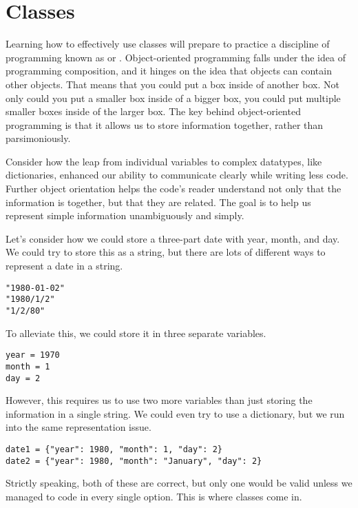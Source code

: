 \section{Classes}
Learning how to effectively use classes will prepare to practice a discipline of programming known as  or . Object-oriented programming falls under the idea of programming composition, and it hinges on the idea that objects can contain other objects. That means that you could put a box inside of another box. Not only could you put a smaller box inside of a bigger box, you could put multiple smaller boxes inside of the larger box. The key behind object-oriented programming is that it allows us to store information together, rather than parsimoniously.\par
Consider how the leap from individual variables to complex datatypes, like dictionaries, enhanced our ability to communicate clearly while writing less code. Further object orientation helps the code's reader understand not only that the information is together, but that they are related. The goal is to help us represent simple information unambiguously and simply.\par
Let's consider how we could store a three-part date with year, month, and day. We could try to store this as a string, but there are lots of different ways to represent a date in a string.
\begin{lstlisting}[style=pippython]
"1980-01-02"
"1980/1/2"
"1/2/80"
\end{lstlisting}
To alleviate this, we could store it in three separate variables.
\begin{lstlisting}[style=pippython]
year = 1970
month = 1
day = 2
\end{lstlisting}
However, this requires us to use two more variables than just storing the information in a single string. We could even try to use a dictionary, but we run into the same representation issue.
\begin{lstlisting}[style=pippython]
date1 = {"year": 1980, "month": 1, "day": 2}
date2 = {"year": 1980, "month": "January", "day": 2}
\end{lstlisting}
Strictly speaking, both of these are correct, but only one would be valid unless we managed to code in every single option. This is where classes come in.
